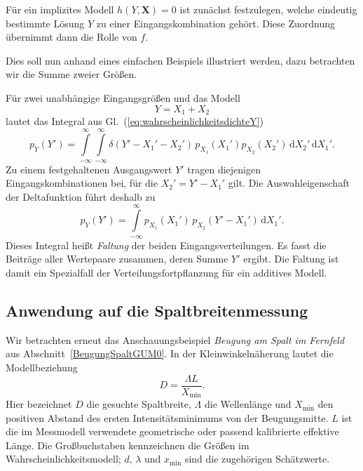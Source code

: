 Für ein implizites Modell $h(Y,\mathbf X)=0$ ist zunächst festzulegen,
welche eindeutig bestimmte Lösung $Y$ zu einer Eingangskombination
gehört. Diese Zuordnung übernimmt dann die Rolle von $f$.

Dies soll nun anhand eines einfachen Beispiels illustriert werden, dazu betrachten wir die Summe zweier Größen.

Für zwei unabhängige Eingangsgrößen und das Modell
\begin{equation}
Y=X_1+X_2
\end{equation}
lautet das Integral aus Gl.\ (\ref{eq:wahrscheinlichkeitsdichteY})
\begin{equation}
p_Y(Y')
=\int\limits_{-\infty}^{\infty}\!\int\limits_{-\infty}^{\infty}
\delta(Y'-X_1'-X_2')\,
p_{X_1}(X_1')p_{X_2}(X_2')\,
\mathrm dX_2'\,\mathrm dX_1'.
\end{equation}
Zu einem festgehaltenen Ausgangswert $Y'$ tragen diejenigen
Eingangskombinationen bei, für die $X_2'=Y'-X_1'$ gilt.
Die Auswahleigenschaft der Deltafunktion führt deshalb zu
\begin{equation}
p_Y(Y')
=\int\limits_{-\infty}^{\infty}
p_{X_1}(X_1')\,p_{X_2}(Y'-X_1')\,\mathrm dX_1'.
\label{eq:Faltungsintegral11}
\end{equation}
Dieses Integral heißt \textsl{Faltung} der beiden Eingangsverteilungen.
Es fasst die Beiträge aller Wertepaare zusammen, deren Summe $Y'$
ergibt. Die Faltung ist damit ein Spezialfall der
Verteilungsfortpflanzung für ein additives Modell.

\subsection{Anwendung auf die Spaltbreitenmessung}

Wir betrachten erneut das Anschauungsbeispiel
\textsl{Beugung am Spalt im Fernfeld} aus
Abschnitt~\ref{BeugungSpaltGUM0}.
In der Kleinwinkelnäherung lautet die Modellbeziehung
\begin{equation}
D=\frac{\Lambda L}{X_{\mathrm{min}}}.
\end{equation}
Hier bezeichnet $D$ die gesuchte Spaltbreite, $\Lambda$ die
Wellenlänge und $X_{\mathrm{min}}$ den positiven Abstand des ersten
Intensitätsminimums von der Beugungsmitte.
$L$ ist die im Messmodell verwendete geometrische oder passend
kalibrierte effektive Länge.
Die Großbuchstaben kennzeichnen die Größen im Wahrscheinlichkeitsmodell;
$d$, $\lambda$ und $x_{\mathrm{min}}$ sind die zugehörigen Schätzwerte.

